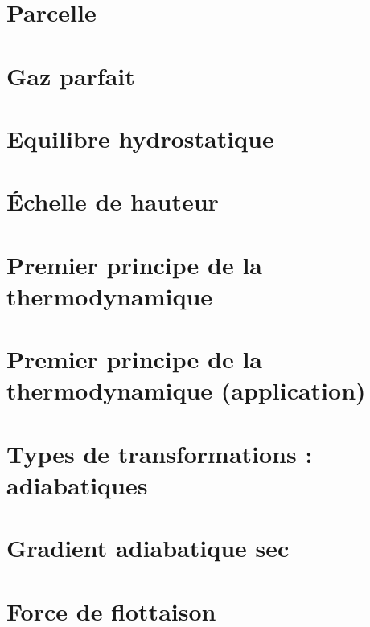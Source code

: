 \documentclass[a4paper,DIV16,10pt]{scrartcl}
\begin{document}
 \inidoc

\newpage
\section{Parcelle}




\newpage
\section{Gaz parfait}


\newpage
\section{Equilibre hydrostatique}


\newpage
\section{\'Echelle de hauteur}


\newpage
\section{Premier principe de la thermodynamique}


\newpage
\section{Premier principe de la thermodynamique (application)}


\newpage
\section{Types de transformations : adiabatiques}


\newpage
\section{Gradient adiabatique sec}


\newpage
\section{Force de flottaison}

\end{document}
